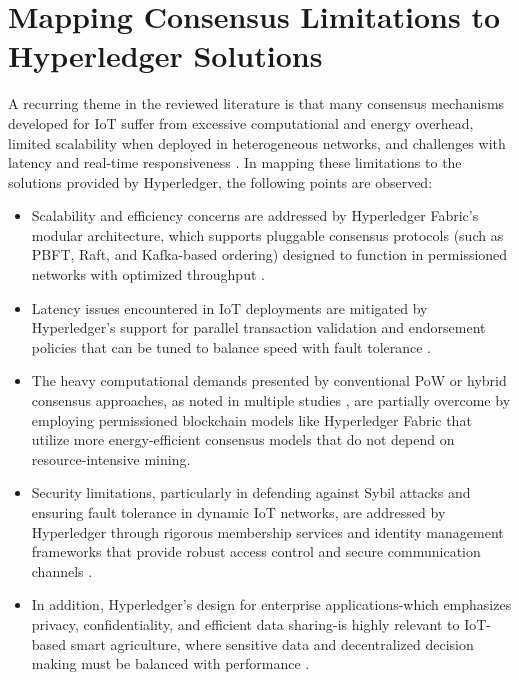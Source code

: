 \documentclass[12pt,onecolumn]{IEEEtran} %
\begin{document}
\section{Mapping Consensus Limitations to Hyperledger Solutions}
A recurring theme in the reviewed literature is that many consensus mechanisms developed for IoT suffer from excessive computational and energy overhead, limited scalability when deployed in heterogeneous networks, and challenges with latency and real-time responsiveness \cite{ali2022blockchainenabledarchitecture, bryant2022keychallengesin, guo2022ahierarchicaland}. In mapping these limitations to the solutions provided by Hyperledger, the following points are observed:
\begin{itemize}
    \item Scalability and efficiency concerns are addressed by Hyperledger Fabric's modular architecture, which supports pluggable consensus protocols (such as PBFT, Raft, and Kafka-based ordering) designed to function in permissioned networks with optimized throughput \cite{khan2022asurveyand, bryant2022keychallengesin}.
    \item Latency issues encountered in IoT deployments are mitigated by Hyperledger's support for parallel transaction validation and endorsement policies that can be tuned to balance speed with fault tolerance \cite{morais2023surveyonintegration, ali2022blockchainenabledarchitecture}.
    \item The heavy computational demands presented by conventional PoW or hybrid consensus approaches, as noted in multiple studies \cite{ali2022blockchainenabledarchitecture, bryant2022keychallengesin}, are partially overcome by employing permissioned blockchain models like Hyperledger Fabric that utilize more energy-efficient consensus models that do not depend on resource-intensive mining.
    \item Security limitations, particularly in defending against Sybil attacks and ensuring fault tolerance in dynamic IoT networks, are addressed by Hyperledger through rigorous membership services and identity management frameworks that provide robust access control and secure communication channels \cite{guru2023asurveyon, platt2023sybilinthe}.
    \item In addition, Hyperledger's design for enterprise applications-which emphasizes privacy, confidentiality, and efficient data sharing-is highly relevant to IoT-based smart agriculture, where sensitive data and decentralized decision making must be balanced with performance \cite{khan2022asurveyand, haque2024ascalableblockchain}.
\end{itemize}
\end{document}
